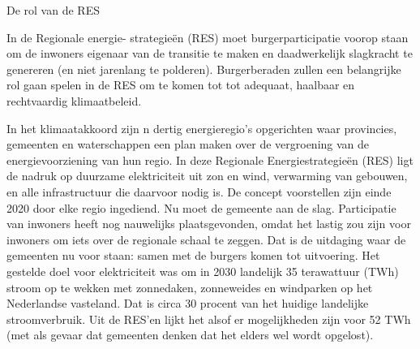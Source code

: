 \begin{voorstel}{De rol van de RES}


\begin{samenvatting}
In de Regionale energie- strategieën (RES) moet burgerparticipatie voorop staan om de inwoners eigenaar van de transitie te maken en daadwerkelijk slagkracht te genereren (en niet jarenlang te polderen). Burgerberaden zullen een belangrijke rol gaan spelen in de RES om te komen tot tot adequaat, haalbaar en rechtvaardig klimaatbeleid. 
\end{samenvatting}

\begin{uitdaging}
In het klimaatakkoord zijn n dertig energieregio’s opgerichten waar provincies, gemeenten en waterschappen een plan maken over de vergroening van de energievoorziening van hun regio. In deze Regionale Energiestrategieën (RES) ligt de nadruk op duurzame elektriciteit uit zon en wind, verwarming van gebouwen, en alle infrastructuur die daarvoor nodig is. De concept voorstellen zijn einde 2020 door elke regio ingediend. Nu moet de gemeente aan de slag. Participatie van inwoners heeft nog nauwelijks plaatsgevonden, omdat het lastig zou zijn voor inwoners om iets over de regionale schaal te zeggen. Dat is de uitdaging waar de gemeenten nu voor staan: samen met de burgers komen tot uitvoering.
Het gestelde doel voor elektriciteit was om in 2030 landelijk 35 terawattuur (TWh) stroom op te wekken met zonnedaken, zonneweides en windparken op het Nederlandse vasteland. Dat is circa 30 procent van het huidige landelijke stroomverbruik. Uit de RES’en lijkt het alsof er mogelijkheden zijn voor 52 TWh (met als gevaar dat gemeenten denken dat het elders wel wordt opgelost).


\end{uitdaging}
\end{voorstel}
